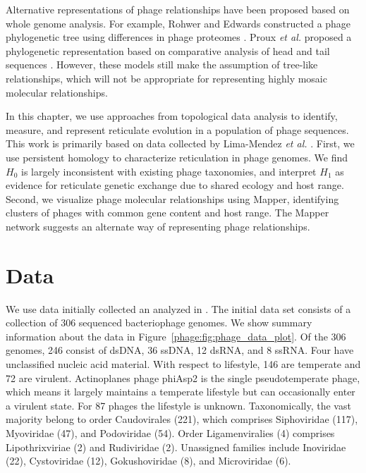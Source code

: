 Alternative representations of phage relationships have been proposed based on whole genome analysis.
For example, Rohwer and Edwards constructed a phage phylogenetic tree using differences in phage proteomes \cite{Rohwer:2002uo}.
Proux \emph{et al.} proposed a phylogenetic representation based on comparative analysis of head and tail sequences \cite{Proux:2002gj}.
However, these models still make the assumption of tree-like relationships, which will not be appropriate for representing highly mosaic molecular relationships.

In this chapter, we use approaches from topological data analysis to identify, measure, and represent reticulate evolution in a population of phage sequences.
This work is primarily based on data collected by Lima-Mendez \emph{et al.} \cite{LimaMendez:2008ki}.
First, we use persistent homology to characterize reticulation in phage genomes.
We find $H_0$ is largely inconsistent with existing phage taxonomies, and interpret $H_1$ as evidence for reticulate genetic exchange due to shared ecology and host range.
Second, we visualize phage molecular relationships using Mapper, identifying clusters of phages with common gene content and host range.
The Mapper network suggests an alternate way of representing phage relationships.

\section{Data}

We use data initially collected an analyzed in \cite{LimaMendez:2008ki}.
The initial data set consists of a collection of 306 sequenced bacteriophage genomes.
We show summary information about the data in Figure~\ref{phage:fig:phage_data_plot}.
Of the 306 genomes, 246 consist of dsDNA, 36 ssDNA, 12 dsRNA, and 8 ssRNA.
Four have unclassified nucleic acid material.
With respect to lifestyle, 146 are temperate and 72 are virulent.
Actinoplanes phage phiAsp2 is the single pseudotemperate phage, which means it largely maintains a temperate lifestyle but can occasionally enter a virulent state.
For 87 phages the lifestyle is unknown.
Taxonomically, the vast majority belong to order Caudovirales (221), which comprises Siphoviridae (117), Myoviridae (47), and Podoviridae (54). 
Order Ligamenviralies (4) comprises Lipothrixviriae (2) and Rudiviridae (2).
Unassigned families include Inoviridae (22), Cystoviridae (12), Gokushoviridae (8), and Microviridae (6).

